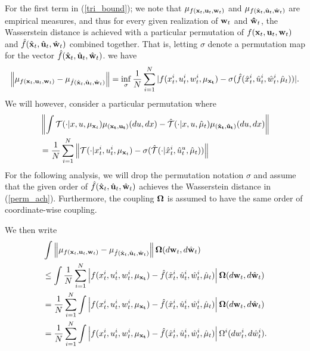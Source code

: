 \documentclass[twoside,11pt]{article}
\begin{document}
For the first term in (\ref{tri_bound}); we note that $\mu_{ f({\bf x}_t,{\bf u}_t,{\bf w}_t)} $ and $ {\mu}_{f(\hat{\bf x}_t, \hat{\bf u}_t , \hat{\bf w}_t) }$ are empirical measures, and thus 
for every given realization of ${\bf w}_t$ and ${\bf \hat{w}}_t$, the Wasserstein distance is achieved with a particular permutation of ${ f({\bf x}_t,{\bf u}_t,{\bf w}_t)}$ and ${\hat{f}(\hat{\bf x}_t, \hat{\bf u}_t , \hat{\bf w}_t) }$ combined together. That is, letting $\sigma$ denote a permutation map for the vector ${\hat{f}(\hat{\bf x}_t, \hat{\bf u}_t , \hat{\bf w}_t) }$. we have
\begin{align*}
 \left\|\mu_{ f({\bf x}_t,{\bf u}_t,{\bf w}_t)} - {\mu}_{\hat{f}(\hat{\bf x}_t, \hat{\bf u}_t , \hat{\bf w}_t) }\right\|  = \inf_\sigma \frac{1}{N}\sum_{i=1}^N |f(x_t^i,u_t^i,w_t^i,\mu_{\bf x_t}) - \sigma(\hat{f}(\hat{x}_t^i,\hat{u}_t^i,\hat{w}_t^i,\hat{\mu}_t))|.
\end{align*}
 We will however, consider a particular permutation where 
\begin{align}\label{perm_ach}
&\left\| \int  \mathcal{T}(\cdot|x,u,\mu_{{\bf x}_t}) \mu_{\bf (x_t,u_t)}(du,dx) - \hat{\mathcal{T}}(\cdot|x,u,\hat{\mu}_t) \mu_{(\bf \hat{x}_t , \hat{u}_t)}(du,dx)\right\|\nonumber\\
&= \frac{1}{N}\sum_{i=1}^N \left\| \mathcal{T}(\cdot|x_t^i,u_t^i,\mu_{{\bf x}_t}) -\sigma(\hat{\mathcal{T}}(\cdot|\hat{x}_t^i,\hat{u}_t^u,\hat{\mu}_t))\right\|
\end{align} 
For the following analysis, we will drop the permutation notation $\sigma$ and assume that the given order of $\hat{f}(\hat{\bf x}_t, \hat{\bf u}_t , \hat{\bf w}_t) $ achieves the Wasserstein distance in (\ref{perm_ach}). Furthermore, the coupling ${\bf \Omega}$ is assumed to have the same order of coordinate-wise coupling.

 We then write
\begin{align}\label{bound1}
 & \int  \left\|\mu_{ f({\bf x}_t,{\bf u}_t,{\bf w}_t)} - {\mu}_{\hat{f}(\hat{\bf x}_t, \hat{\bf u}_t , \hat{\bf w}_t) }\right\| {\bf \Omega}(d{\bf w}_t, d\hat{\bf w}_t) \nonumber\\
&\leq \int \frac{1}{N}\sum_{i=1}^N \left| f(x^i_t,u^i_t,w_t^i, \mu_{\bf x_t}) - \hat{f}(\hat{x}_t^i,\hat{u}_t^i,\hat{w}_t^i,\hat{\mu}_t) \right|  {\bf \Omega}(d{\bf w}_t, d\hat{\bf w}_t)\nonumber \\
& =  \frac{1}{N}\sum_{i=1}^N \int  \left| f(x^i_t,u^i_t,w_t^i, \mu_{\bf x_t}) - \hat{f}(\hat{x}_t^i,\hat{u}_t^i,\hat{w}_t^i,\hat{\mu}_t) \right|  {\bf \Omega}(d{\bf w}_t, d\hat{\bf w}_t)\nonumber \\
&= \frac{1}{N}\sum_{i=1}^N \int  \left| f(x^i_t,u^i_t,w_t^i, \mu_{\bf x_t}) - \hat{f}(\hat{x}_t^i,\hat{u}_t^i,\hat{w}_t^i,\hat{\mu}_t) \right|  { \Omega^i}(dw^i_t, d\hat{w}^i_t). 
\end{align}
\end{document}
